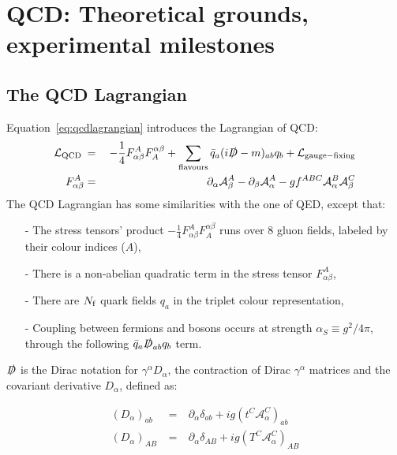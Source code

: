 \section{QCD: Theoretical grounds, experimental milestones}
\label{sec:QCD}
\subsection{The QCD Lagrangian}
\label{sec:lagrangian}
Equation~\ref{eq:qcdlagrangian} introduces the Lagrangian of QCD:
\begin{eqnarray}
\mathcal{L}_{\rm{QCD}}\:&=&\:-\frac{1}{4}F^{A}_{\alpha\beta}F^{\alpha\beta}_{A} +
\sum_{\rm{flavours}}\bar{q}_{a}(i\slashed{D} - m)_{ab}q_{b} +
\mathcal{L}_{\rm{gauge-fixing}} \label{eq:qcdlagrangian}\\
F^{A}_{\alpha\beta} &=& \partial_{\alpha}\mathcal{A}^{A}_{\beta}
- \partial_{\beta}\mathcal{A}^{A}_{\alpha} -
gf^{ABC}\mathcal{A}_{\alpha}^{B}\mathcal{A}_{\beta}^{C} \label{eq:qcdstresstensor}
\end{eqnarray}
\vspace{0.5cm}
The QCD Lagrangian has some similarities with the one of QED, except that:
\begin{itemize}
\item[-] The stress tensors' product $-\frac{1}{4}F^{A}_{\alpha\beta}F^{\alpha\beta}_{A}$ runs over 8 gluon fields, labeled by their colour indices ($A$),
\item[-] There is a non-abelian quadratic term in the stress tensor $F^{A}_{\alpha\beta}$, 
\item[-] There are $N_{\rm f}$ quark fields $q_{a}$ in the
  triplet colour representation,
\item[-] Coupling between fermions and bosons occurs at strength
  $\alpha_{S} \equiv g^{2}/4\pi$, through the following $\bar{q}_{a} \slashed{D}_{ab} q_{b}$ term.
\end{itemize} 

$\slashed{D}$ is the Dirac notation for $\gamma^{\alpha}D_{\alpha}$, the contraction of Dirac
$\gamma^{\alpha}$ matrices and the covariant derivative $D_{\alpha}$, defined as:

\begin{eqnarray}
(D_{\alpha})_{ab} \: &=& \: \partial_{\alpha}\delta_{ab} +
ig\left(t^{C}\mathcal{A}^C_{\alpha}\right)_{ab}\\
(D_{\alpha})_{AB} \: &=& \: \partial_{\alpha}\delta_{AB} + ig\left(T^{C}\mathcal{A}^C_{\alpha}\right)_{AB}
\end{eqnarray}

